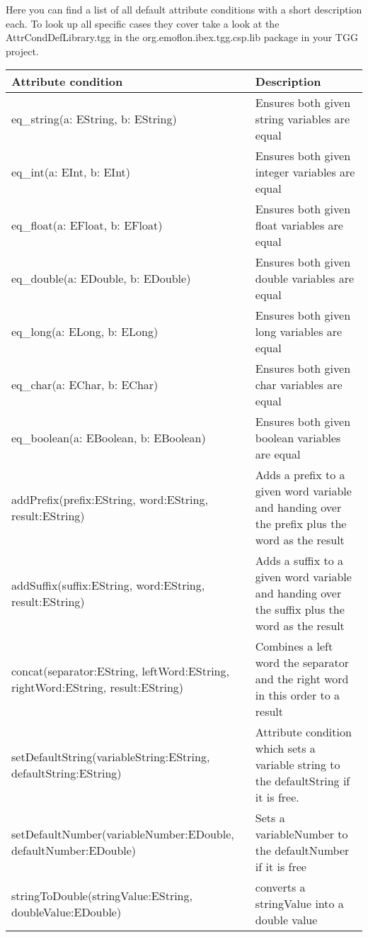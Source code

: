Here you can find a list of all default attribute conditions with a short description each. To look up all specific cases they cover take a look at the AttrCondDefLibrary.tgg in the org.emoflon.ibex.tgg.csp.lib package in your TGG project.\newline

{
\begin{center}
\begin{tabular}{ | m{6cm} | m{7cm} |  }
\hline
\textbf{Attribute condition} & \textbf{Description} \\
\hline
eq\_string(a: EString, b: EString)  & Ensures both given string variables are equal  \\
\hline
eq\_int(a: EInt, b: EInt)  & Ensures both given integer variables are equal  \\
\hline
eq\_float(a: EFloat, b: EFloat) & Ensures both given float variables are equal \\
\hline
eq\_double(a: EDouble, b: EDouble) & Ensures both given double variables are equal \\
\hline
eq\_long(a: ELong, b: ELong)  & Ensures both given long variables are equal \\
\hline
eq\_char(a: EChar, b: EChar) & Ensures both given char variables are equal \\
\hline
eq\_boolean(a: EBoolean, b: EBoolean) & Ensures both given boolean variables are equal \\
\hline
addPrefix(prefix:EString, word:EString, result:EString) & Adds a prefix to a given word variable and handing over the prefix plus the word as the result \\
\hline
addSuffix(suffix:EString, word:EString, result:EString)  & Adds a suffix to a given word variable and handing over the suffix plus the word as the result \\
\hline
concat(separator:EString, leftWord:EString, rightWord:EString, result:EString) & Combines a left word the separator and the right word in this order to a result \\
\hline
setDefaultString(variableString:EString, defaultString:EString) & Attribute condition which sets a variable string to the defaultString if it is free. \\
\hline
setDefaultNumber(variableNumber:EDouble, defaultNumber:EDouble) & Sets a variableNumber to the defaultNumber if it is free \\
\hline
stringToDouble(stringValue:EString, doubleValue:EDouble) & converts a stringValue into a double value \\

\end{tabular}
\end{center}}
